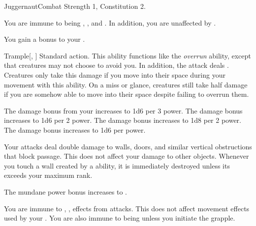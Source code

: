   \begin{feat}{Juggernaut}{Combat}
    \featpre Strength 1, Constitution 2.

     You are immune to being \slowed, \immobilized, and \paralyzed.
    In addition, you are unaffected by .

     You gain a  bonus to your .

    \begin{activeability}{Trample}[, ]
      \abilityusagetime Standard action.
      \rankline
      This ability functions like the \textit{overrun} ability, except that creatures may not choose to avoid you.
      In addition, the attack deals \damageranktwo{}.
      Creatures only take this damage if you move into their space during your movement with this ability.
      On a miss or glance, creatures still take half damage if you are somehow able to move into their space despite failing to overrun them.

      \rankline
       The damage bonus from your  increases to 1d6 per 3 power.
       The damage bonus increases to 1d6 per 2 power.
       The damage bonus increases to 1d8 per 2 power.
       The damage bonus increases to 1d6 per power.
    \end{activeability}

     Your attacks deal double damage to walls, doors, and similar vertical obstructions that block passage.
    This does not affect your damage to other objects.
    Whenever you touch a wall created by a  ability, it is immediately destroyed unless its  exceeds your maximum rank.

     The mundane power bonus increases to .

     You are immune to , ,  effects from attacks.
    This does not affect movement effects used by your .
    You are also immune to being \grappled unless you initiate the grapple.
  \end{feat}


